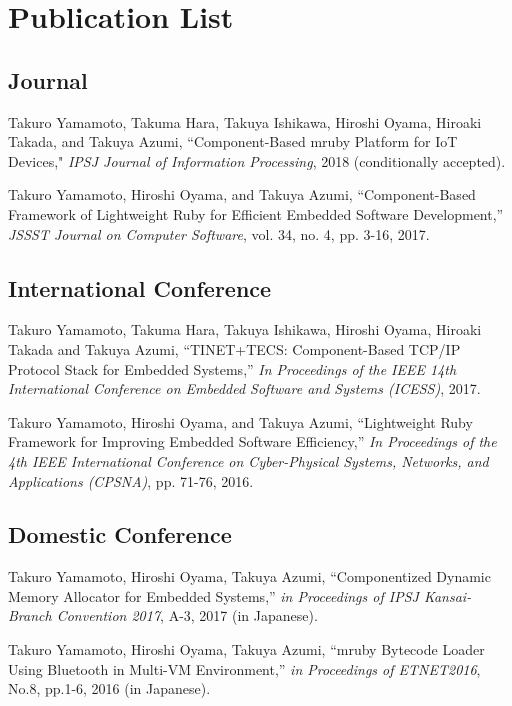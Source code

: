 \documentclass[a4j,12pt,oneside,openany,english]{jsbook}
\begin{document}



\chapter*{Publication List}
\section*{Journal}
\begin{enumerate}[{[}1{]}]
\item
    Takuro Yamamoto, Takuma Hara, Takuya Ishikawa, Hiroshi Oyama, Hiroaki Takada, and Takuya Azumi,
    ``Component-Based mruby Platform for IoT Devices,"
    \emph{IPSJ Journal of Information Processing},
    2018 (conditionally accepted).
\item
    Takuro Yamamoto, Hiroshi Oyama, and Takuya Azumi,
    ``Component-Based Framework of Lightweight Ruby for Efficient Embedded Software Development,''
    \emph{JSSST Journal on Computer Software},
    vol. 34, no. 4, pp. 3-16, 2017.
\end{enumerate}

\section*{International Conference}
\begin{enumerate}[{[}1{]}]
\item
    Takuro Yamamoto, Takuma Hara, Takuya Ishikawa, Hiroshi Oyama, Hiroaki Takada and Takuya Azumi,
    ``TINET+TECS: Component-Based TCP/IP Protocol Stack for Embedded Systems,''
    \emph{In Proceedings of the IEEE 14th International Conference on Embedded Software and Systems (ICESS)},
    2017.
\item
    Takuro Yamamoto, Hiroshi Oyama, and Takuya Azumi,
    ``Lightweight Ruby Framework for Improving Embedded Software Efficiency,''
    \emph{In Proceedings of the 4th IEEE International Conference on Cyber-Physical Systems, Networks, and Applications (CPSNA)},
    pp. 71-76, 2016.
\end{enumerate}

\section*{Domestic Conference}
\begin{enumerate}[{[}1{]}]
\item
    Takuro Yamamoto, Hiroshi Oyama, Takuya Azumi,
    ``Componentized Dynamic Memory Allocator for Embedded Systems,''
    \emph{in Proceedings of IPSJ Kansai-Branch Convention 2017},
    A-3, 2017 (in Japanese).
\item
    Takuro Yamamoto, Hiroshi Oyama, Takuya Azumi,
    ``mruby Bytecode Loader Using Bluetooth in Multi-VM Environment,''
    \emph{in Proceedings of ETNET2016},
    No.8, pp.1-6, 2016 (in Japanese).
\end{enumerate}
\end{document}
